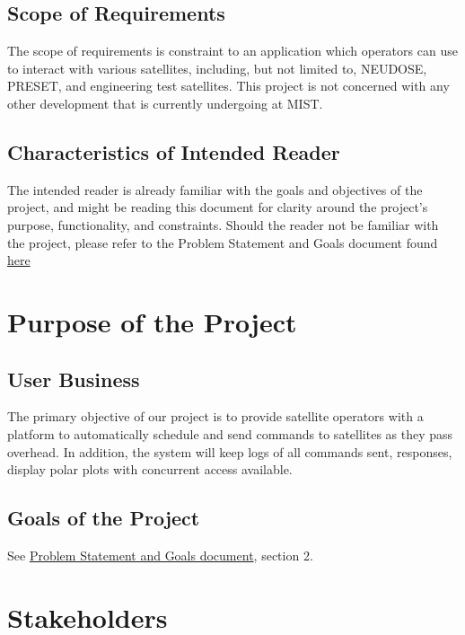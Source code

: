 \documentclass[12pt]{article}
\begin{document}
\subsection{Scope of Requirements}
The scope of requirements is constraint to an application which operators can use to interact with various satellites, including, but not limited to, NEUDOSE, PRESET, and engineering test satellites. This project is not concerned with any other development that is currently undergoing at MIST.

\subsection{Characteristics of Intended Reader}
The intended reader is already familiar with the goals and objectives of the project, and might be reading this document for clarity around the project’s purpose, functionality, and constraints. Should the reader not be familiar with the project, please refer to the Problem Statement and Goals document found \href{https://github.com/RishiVaya/Lower_Earth_Orbiters/blob/main/docs/ProblemStatementAndGoals/ProblemStatement.pdf}{here} 

\section{Purpose of the Project}
\subsection{User Business}
The primary objective of our project is to provide satellite operators with a platform to automatically schedule and send commands to satellites as they pass overhead. In addition, the system will keep logs of all commands sent, responses, display polar plots with concurrent access available. 
\subsection{Goals of the Project}
See \href{https://github.com/RishiVaya/Lower_Earth_Orbiters/blob/main/docs/ProblemStatementAndGoals/ProblemStatement.pdf}{ Problem Statement and Goals document}, section 2.
\section{Stakeholders}
\end{document}
